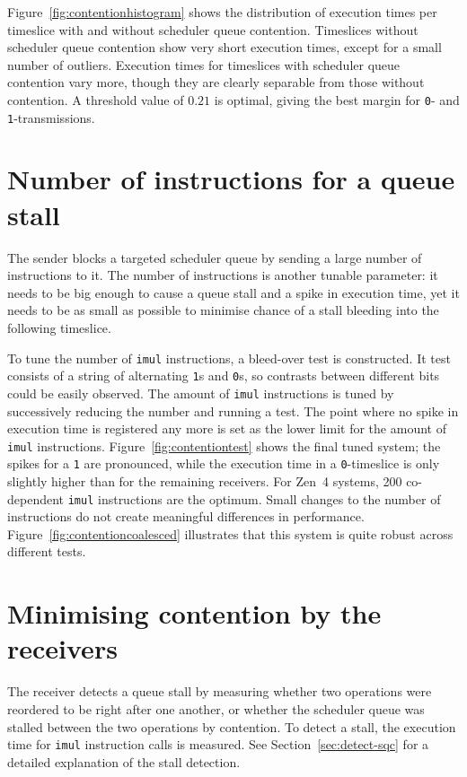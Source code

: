 \documentclass[11pt,
  titlepage=false,
  parskip=half,      %
]{scrreprt}
\begin{document}
Figure~\ref{fig:contentionhistogram} shows the distribution of execution times per timeslice with and without scheduler queue contention.
Timeslices without scheduler queue contention show very short execution times, except for a small number of outliers.
Execution times for timeslices with scheduler queue contention vary more, though they are clearly separable from those without contention.
A threshold value of $0.21$ is optimal, giving the best margin for \texttt{0}- and \texttt{1}-transmissions.


\section{Number of instructions for a queue stall}
The sender blocks a targeted scheduler queue by sending a large number of instructions to it.
The number of instructions is another tunable parameter:
it needs to be big enough to cause a queue stall and a spike in execution time,
yet it needs to be as small as possible to minimise chance of a stall bleeding into the following timeslice.

To tune the number of \texttt{imul} instructions, a bleed-over test is constructed.
It test consists of a string of alternating \texttt{1}s and \texttt{0}s, so contrasts between different bits could be easily observed.
The amount of \texttt{imul} instructions is tuned by successively reducing the number and running a test.
The point where no spike in execution time is registered any more is set as the lower limit for the amount of \texttt{imul} instructions.
Figure~\ref{fig:contentiontest} shows the final tuned system;
the spikes for a \texttt{1} are pronounced, while the execution time in a \texttt{0}-timeslice is only slightly higher than for the remaining receivers.
For Zen~4 systems, 200 co-dependent \texttt{imul} instructions are the optimum.
Small changes to the number of instructions do not create meaningful differences in performance.
Figure~\ref{fig:contentioncoalesced} illustrates that this system is quite robust across different tests.

\section{Minimising contention by the receivers}
\label{sec:reducecontention}
The receiver detects a queue stall by measuring whether two operations were reordered to be right after one another,
or whether the scheduler queue was stalled between the two operations by contention.
To detect a stall, the execution time for \texttt{imul} instruction calls is measured.
See Section~\ref{sec:detect-sqc} for a detailed explanation of the stall detection.
\end{document}
